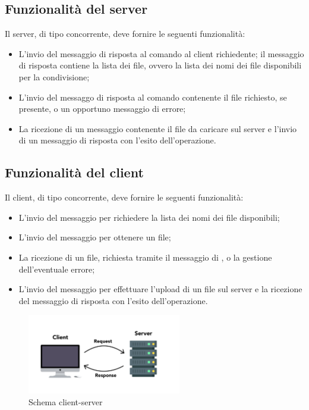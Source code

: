 \subsection{Funzionalità del server }
Il server, di tipo concorrente, deve fornire le seguenti funzionalità:
\begin{itemize}
    \item L'invio del messaggio di risposta al comando  al client richiedente; il messaggio di risposta contiene la lista dei file, ovvero la lista dei nomi dei file disponibili per la condivisione;
    \item L'invio del messaggo di risposta al comando  contenente il file richiesto, se presente, o un opportuno messaggio di errore;
    \item La ricezione di un messaggio  contenente il file da caricare sul server e l'invio di un messaggio di risposta con l'esito dell'operazione.
\end{itemize}

\subsection{Funzionalità del client }
Il client, di tipo concorrente, deve fornire le seguenti funzionalità:
\begin{itemize}
    \item L'invio del messaggio  per richiedere la lista dei nomi dei file disponibili;
    \item L'invio del messaggio  per ottenere un file;
    \item La ricezione di un file, richiesta tramite il messaggio di , o la gestione dell'eventuale errore;
    \item L'invio del messaggio  per effettuare l'upload di un file sul server e la ricezione del messaggio di risposta con l'esito dell'operazione.
\end{itemize}

\begin{figure}[h]
    \centering
    \includegraphics[width=0.6\textwidth]{imgs/01/client-server.jpeg}
    \caption{Schema client-server}
\end{figure}

